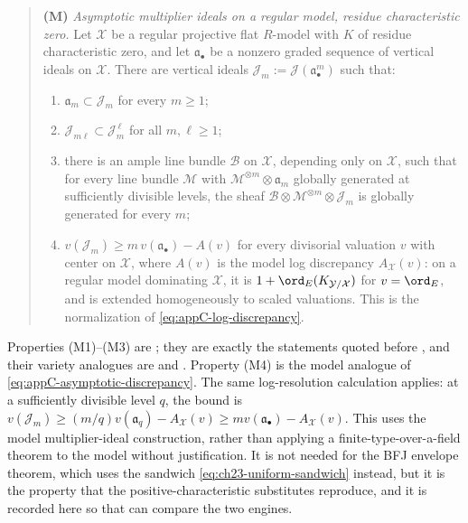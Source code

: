 \begin{quote}
\textbf{(M)} \emph{Asymptotic multiplier ideals on a regular model, residue
characteristic zero.}  Let $\mathcal X$ be a regular projective flat
$R$-model with $K$ of residue characteristic zero, and let
$\mathfrak a_\bullet$ be a nonzero graded sequence of vertical ideals on
$\mathcal X$.  There are vertical ideals
$\mathcal J_m:=\mathcal J(\mathfrak a_\bullet^m)$ such that:
\begin{enumerate}
\item[(M1)] $\mathfrak a_m\subset\mathcal J_m$ for every $m\geq1$;
\item[(M2)] $\mathcal J_{m\ell}\subset\mathcal J_m^{\,\ell}$ for all
$m,\ell\geq1$;
\item[(M3)] there is an ample line bundle $\mathcal B$ on
$\mathcal X$, depending only on $\mathcal X$, such that for every line
bundle $\mathcal M$ with $\mathcal M^{\otimes m}\otimes\mathfrak a_m$
globally generated at sufficiently divisible levels, the sheaf
$\mathcal B\otimes\mathcal M^{\otimes m}\otimes\mathcal J_m$ is globally
generated for every $m$;
\item[(M4)] $v(\mathcal J_m)\geq m\,v(\mathfrak a_\bullet)-A(v)$ for every
divisorial valuation $v$ with center on $\mathcal X$, where $A(v)$ is
the model log discrepancy $A_{\mathcal X}(v)$: on a regular model
dominating $\mathcal X$, it is $1+\ord_E(K_{\mathcal Y/\mathcal X})$
for $v=\ord_E$, and is extended homogeneously to scaled valuations.
This is the normalization of \eqref{eq:appC-log-discrepancy}.
\end{enumerate}
\end{quote}

Properties (M1)--(M3) are \cite[Theorem~B.8 and Remark~B.9]{BFJ16}; they are
exactly the statements quoted before
, and their variety analogues are
 and
.  Property (M4) is the
model analogue of \eqref{eq:appC-asymptotic-discrepancy}.  The same
log-resolution calculation applies: at a sufficiently divisible level $q$,
the bound is
$v(\mathcal J_m)\geq(m/q)v(\mathfrak a_q)-A_{\mathcal X}(v)
\geq m v(\mathfrak a_\bullet)-A_{\mathcal X}(v)$.
This uses the model multiplier-ideal construction, rather than applying a
finite-type-over-a-field theorem to the model without justification.  It is not needed
for the BFJ envelope theorem, which uses the sandwich
\eqref{eq:ch23-uniform-sandwich} instead, but it is the property that the
positive-characteristic substitutes reproduce, and it is recorded here so
that  can compare the two engines.

